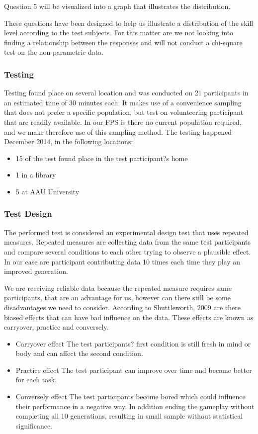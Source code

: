Question 5 will be visualized into a graph that illustrates the distribution.

These questions have been designed to help us illustrate a distribution of the skill level according to the test subjects. For this matter are we not looking into finding a relationship between the responses and will not conduct a chi-square test on the non-parametric data.

\subsubsection{Testing}
Testing found place on several location and was conducted on 21 participants in an estimated time of 30 minutes each.
It makes use of a convenience sampling that does not prefer a specific population, but test on volunteering participant that are readily available. \cite{Exploarable2009} In our FPS is there no current population required, and we make therefore use of this sampling method. The testing happened December 2014, in the following locations:
\begin{itemize}
\item 15 of the test found place in the test participant?s home
\item 1 in a library
\item 5 at AAU University
 \end{itemize}

\subsubsection{Test Design}
The performed test is considered an experimental design test that uses repeated measures.
Repeated measures are collecting data from the same test participants and compare several conditions to each other trying to observe a plausible effect. \cite{Shuttleworth2009} In our case are participant contributing data 10 times each time they play an improved generation.

We are receiving reliable data because the repeated measure requires same participants, that are an advantage for us, however can there still be some disadvantages we need to consider. According to Shuttleworth, 2009 are there biased effects that can have bad influence on the data. These effects are known as carryover, practice and conversely. \cite{Shuttleworth2009}

\begin{itemize}
\item Carryover effect
The test participants? first condition is still fresh in mind or body and can affect the second condition.

\item Practice effect
The test participant can improve over time and become better for each task.

\item Conversely effect
The test participants become bored which could influence their performance in a negative way. In addition ending the gameplay without completing all 10 generations, resulting in small sample without statistical significance.

 \end{itemize}



